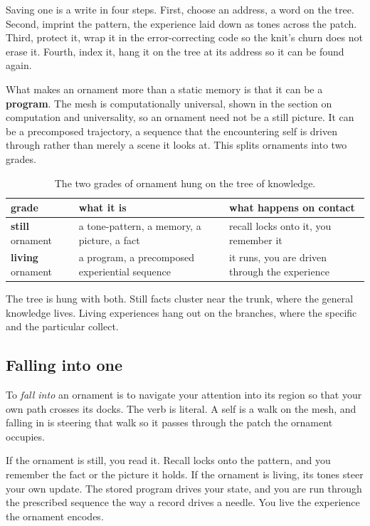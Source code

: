 Saving one is a write in four steps. First, choose an address, a word on the tree. Second, imprint the pattern, the experience laid down as tones across the patch. Third, protect it, wrap it in the error-correcting code so the knit's churn does not erase it. Fourth, index it, hang it on the tree at its address so it can be found again.

What makes an ornament more than a static memory is that it can be a \textbf{program}. The mesh is computationally universal, shown in the section on computation and universality, so an ornament need not be a still picture. It can be a precomposed trajectory, a sequence that the encountering self is driven through rather than merely a scene it looks at. This splits ornaments into two grades.

\begin{table}[ht]
\centering
\begin{tabular}{@{}lll@{}}
\toprule
grade & what it is & what happens on contact \\
\midrule
\textbf{still} ornament & a tone-pattern, a memory, a picture, a fact & recall locks onto it, you remember it \\
\textbf{living} ornament & a program, a precomposed experiential sequence & it runs, you are driven through the experience \\
\bottomrule
\end{tabular}
\caption{The two grades of ornament hung on the tree of knowledge.}
\label{tab:ornament-grades}
\end{table}

The tree is hung with both. Still facts cluster near the trunk, where the general knowledge lives. Living experiences hang out on the branches, where the specific and the particular collect.

\subsection{Falling into one}

To \emph{fall into} an ornament is to navigate your attention into its region so that your own path crosses its docks. The verb is literal. A self is a walk on the mesh, and falling in is steering that walk so it passes through the patch the ornament occupies.

If the ornament is still, you read it. Recall locks onto the pattern, and you remember the fact or the picture it holds. If the ornament is living, its tones steer your own update. The stored program drives your state, and you are run through the prescribed sequence the way a record drives a needle. You live the experience the ornament encodes.

